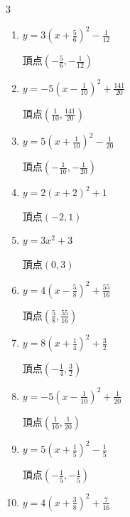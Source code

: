 \begin{multicols}{3}
\begin{enumerate}
        $\displaystyle 頂点\left( -\frac{1}{18} , -\frac{143}{36} \right)$

  \item $\displaystyle y=3\left( x+\frac{5}{6}\right)^{2}-\frac{1}{12}$

        $\displaystyle 頂点\left( -\frac{5}{6} , -\frac{1}{12} \right)$

  \item $\displaystyle y=-5\left( x-\frac{1}{10}\right)^{2}+\frac{141}{20}$

        $\displaystyle 頂点\left( \frac{1}{10} , \frac{141}{20} \right)$

  \item $\displaystyle y=5\left( x+\frac{1}{10}\right)^{2}-\frac{1}{20}$

        $\displaystyle 頂点\left( -\frac{1}{10} , -\frac{1}{20} \right)$

\columnbreak %

  \item $\displaystyle y=2\left( x+2\right)^{2}+1$

        $\displaystyle 頂点\left( -2 , 1 \right)$

  \item $\displaystyle y=3x^{2}+3$

        $\displaystyle 頂点\left( 0 , 3 \right)$

  \item $\displaystyle y=4\left( x-\frac{5}{8}\right)^{2}+\frac{55}{16}$

        $\displaystyle 頂点\left( \frac{5}{8} , \frac{55}{16} \right)$

  \item $\displaystyle y=8\left( x+\frac{1}{4}\right)^{2}+\frac{3}{2}$

        $\displaystyle 頂点\left( -\frac{1}{4} , \frac{3}{2} \right)$

  \item $\displaystyle y=-5\left( x-\frac{1}{10}\right)^{2}+\frac{1}{20}$

        $\displaystyle 頂点\left( \frac{1}{10} , \frac{1}{20} \right)$

  \item $\displaystyle y=5\left( x+\frac{1}{5}\right)^{2}-\frac{1}{5}$

        $\displaystyle 頂点\left( -\frac{1}{5} , -\frac{1}{5} \right)$

  \item $\displaystyle y=4\left( x+\frac{3}{8}\right)^{2}+\frac{7}{16}$


\end{enumerate}
\end{multicols}
